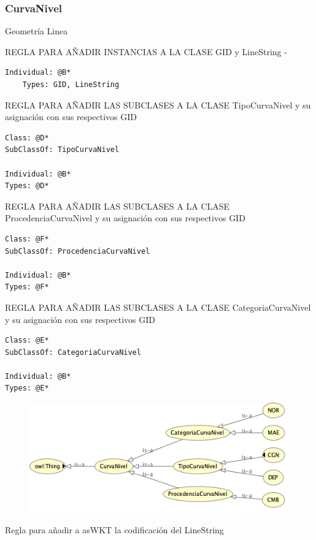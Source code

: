 \subsubsection{CurvaNivel}

Geometría Linea


REGLA PARA AÑADIR INSTANCIAS A LA CLASE GID y LineString - 
\begin{lstlisting}
Individual: @B*
	Types: GID, LineString
\end{lstlisting}


REGLA PARA AÑADIR LAS SUBCLASES A LA CLASE TipoCurvaNivel y su asignación con sus respectivos GID

\begin{lstlisting}
Class: @D*
SubClassOf: TipoCurvaNivel

Individual: @B*
Types: @D*
\end{lstlisting}



REGLA PARA AÑADIR LAS SUBCLASES A LA CLASE ProcedenciaCurvaNivel y su asignación con sus respectivos GID

\begin{lstlisting}
Class: @F*
SubClassOf: ProcedenciaCurvaNivel

Individual: @B*
Types: @F*
\end{lstlisting}




REGLA PARA AÑADIR LAS SUBCLASES A LA CLASE CategoriaCurvaNivel y su asignación con sus respectivos GID

\begin{lstlisting}
Class: @E*
SubClassOf: CategoriaCurvaNivel

Individual: @B*
Types: @E*
\end{lstlisting}


\begin{figure}[H]
	\centering
	\includegraphics[width=0.7\linewidth]{imagenes/capitulo4/tipos-curvasnivel}
	\caption{}
	\label{fig:tipos-curvasnivel}
\end{figure}


Regla para añadir a asWKT la codificación del LineString


